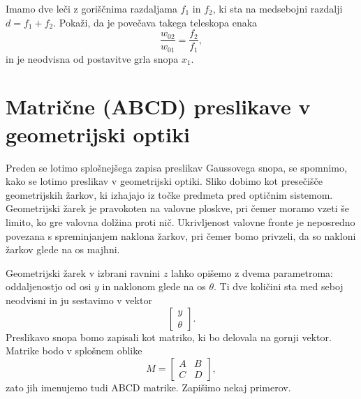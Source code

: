 \begin{definition}
\label{teleskop}
Imamo dve leči z goriščnima razdaljama $f_{1}$ in $f_{2}$, ki sta na medsebojni
razdalji $d=f_{1}+f_{2}$. Pokaži, da je povečava takega teleskopa enaka  
\begin{equation}
\frac{w_{02}}{w_{01}}=\frac{f_{2}}{f_{1}},
\label{eq:povecava-teleskop}
\end{equation}
in je neodvisna od postavitve grla snopa $x_{1}$.
\end{definition}

\section{Matrične (ABCD) preslikave v geometrijski optiki}

Preden se lotimo splošnejšega zapisa preslikav Gaussovega snopa, se spomnimo, kako
se lotimo preslikav v geometrijski optiki. 
Sliko dobimo kot presečišče geometrijskih žarkov,
ki izhajajo iz točke predmeta pred optičnim sistemom. Geometrijski
žarek je pravokoten na valovne ploskve, pri čemer moramo vzeti še limito,
ko gre valovna dolžina proti nič. Ukrivljenost valovne fronte je neposredno
povezana s spreminjanjem naklona žarkov, pri čemer bomo privzeli, da so 
nakloni žarkov glede na os majhni.

Geometrijski žarek v izbrani ravnini $z$ lahko opišemo z dvema parametroma: 
oddaljenostjo od osi $y$ in naklonom glede na os $\theta$. Ti dve količini 
sta med seboj neodvisni in ju sestavimo 
v vektor
\begin{equation}
\left[\begin{array}{c}
y\\
\theta
\end{array}\right].
\end{equation}
Preslikavo snopa bomo zapisali kot matriko, ki bo delovala na gornji vektor. 
Matrike bodo v splošnem oblike
\begin{equation}
M = \left[\begin{array}{cc}
A & B\\
C & D
\end{array}\right],
\end{equation}
zato jih imenujemo tudi ABCD matrike. Zapišimo nekaj primerov.

